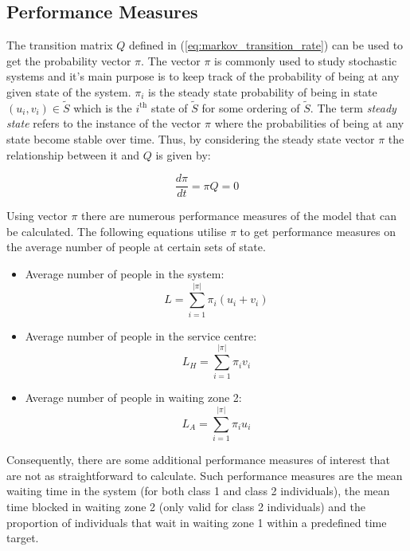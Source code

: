 \subsection{Performance Measures}


The transition matrix \( Q \) defined in (\ref{eq:markov_transition_rate}) can 
be used to get the probability vector \( \pi \).
The vector \( \pi \) is commonly used to study stochastic systems and it's main
purpose is to keep track of the probability of being at any given state of 
the system. 
\(\pi_i\) is the steady state probability of being in state \((u_i, v_i) \in 
\tilde S\) which is the \(i^{\text{th}}\) state of \(\tilde S\) for some ordering of 
\(\tilde S\).
The term \textit{steady state} refers to the instance of the vector \( \pi \) 
where the probabilities of being at any state become stable over time. 
Thus, by considering the steady state vector \( \pi \) the relationship between 
it and \( Q \) is given by:

\[
    \frac{d\pi}{dt} = \pi Q = 0
\]

Using vector \(\pi\) there are numerous performance measures of the model that 
can be calculated. 
The following equations utilise \(\pi\) to get performance measures on the 
average number of people at certain sets of state.

\begin{itemize}
    \item Average number of people in the system: 
        \[L = \sum_{i=1}^{|\pi|} \pi_i (u_i + v_i)\]
    \item Average number of people in the service centre: 
        \[L_H = \sum_{i=1}^{|\pi|} \pi_i v_i\]
    \item Average number of people in waiting zone 2:
        \[L_A = \sum_{i=1}^{|\pi|} \pi_i u_i\] 
\end{itemize}

Consequently, there are some additional performance measures of interest that
are not as straightforward to calculate.
Such performance measures are the mean waiting time in the system (for both 
class 1 and class 2 individuals), the mean time blocked in waiting zone 2 (only 
valid for class 2 individuals) and the proportion of individuals that wait in 
waiting zone 1 within a predefined time target.






